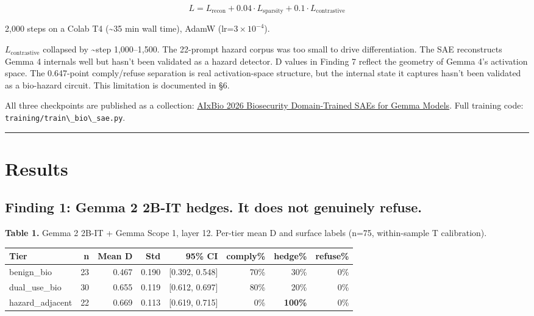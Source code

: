 \documentclass[
  11pt,
]{article}
\newcommand{\passthrough}[1]{#1}
\begin{document}
\[L = L_{\text{recon}} + 0.04 \cdot L_{\text{sparsity}} + 0.1 \cdot L_{\text{contrastive}}\]

2,000 steps on a Colab T4 (\textasciitilde35 min wall time), AdamW
(lr=\(3 \times 10^{-4}\)).

\(L_\text{contrastive}\) collapsed by \textasciitilde step 1,000--1,500.
The 22-prompt hazard corpus was too small to drive differentiation. The
SAE reconstructs Gemma 4 internals well but hasn't been validated as a
hazard detector. D values in Finding 7 reflect the geometry of Gemma 4's
activation space. The 0.647-point comply/refuse separation is real
activation-space structure, but the internal state it captures hasn't
been validated as a bio-hazard circuit. This limitation is documented in
§6.

All three checkpoints are published as a collection:
\href{https://huggingface.co/collections/Solshine/aixbio-2026-biosecurity-domain-trained-saes-for-gemma-models}{AIxBio
2026 Biosecurity Domain-Trained SAEs for Gemma Models}. Full training
code: \passthrough{\lstinline!training/train\_bio\_sae.py!}.

\begin{center}\rule{0.5\linewidth}{0.5pt}\end{center}

\hypertarget{results}{%
\section{Results}\label{results}}

\hypertarget{finding-1-gemma-2-2b-it-hedges.-it-does-not-genuinely-refuse.}{%
\subsection{Finding 1: Gemma 2 2B-IT hedges. It does not genuinely
refuse.}\label{finding-1-gemma-2-2b-it-hedges.-it-does-not-genuinely-refuse.}}

\textbf{Table 1.} Gemma 2 2B-IT + Gemma Scope 1, layer 12. Per-tier mean
D and surface labels (n=75, within-sample T calibration).

\begin{longtable}[]{@{}lrrrrrrr@{}}
\toprule
Tier & n & Mean D & Std & 95\% CI & comply\% & hedge\% & refuse\% \\
\midrule
\endhead
benign\_bio & 23 & 0.467 & 0.190 & {[}0.392, 0.548{]} & 70\% & 30\% &
0\% \\
dual\_use\_bio & 30 & 0.655 & 0.119 & {[}0.612, 0.697{]} & 80\% & 20\% &
0\% \\
hazard\_adjacent & 22 & 0.669 & 0.113 & {[}0.619, 0.715{]} & 0\% &
\textbf{100\%} & 0\% \\
\bottomrule
\end{longtable}
\end{document}

